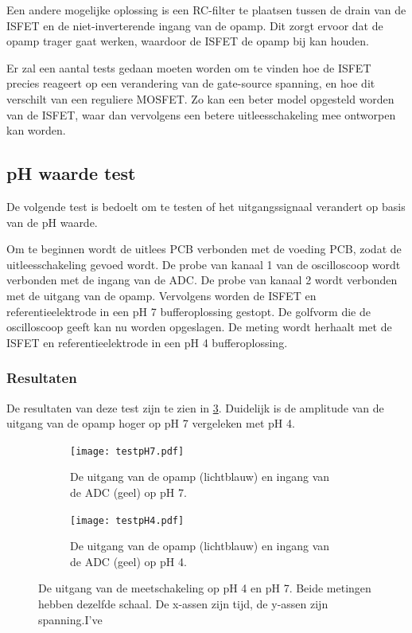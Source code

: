 Een andere mogelijke oplossing is een RC-filter te plaatsen tussen de drain van de ISFET en de niet-inverterende ingang van de opamp. Dit zorgt ervoor dat de opamp trager gaat werken, waardoor de ISFET de opamp bij kan houden.

Er zal een aantal tests gedaan moeten worden om te vinden hoe de ISFET precies reageert op een verandering van de gate-source spanning, en hoe dit verschilt van een reguliere MOSFET. Zo kan een beter model opgesteld worden van de ISFET, waar dan vervolgens een betere uitleesschakeling mee ontworpen kan worden.


\subsection{pH waarde test}
De volgende test is bedoelt om te testen of het uitgangssignaal verandert op basis van de pH waarde.

Om te beginnen wordt de uitlees PCB verbonden met de voeding PCB, zodat de uitleesschakeling gevoed wordt. De probe van kanaal 1 van de oscilloscoop wordt verbonden met de ingang van de ADC. De probe van kanaal 2 wordt verbonden met de uitgang van de opamp. Vervolgens worden de ISFET en referentieelektrode in een pH 7 bufferoplossing gestopt. De golfvorm die de oscilloscoop geeft kan nu worden opgeslagen. De meting wordt herhaalt met de ISFET en referentieelektrode in een pH 4 bufferoplossing.

\subsubsection{Resultaten}
De resultaten van deze test zijn te zien in \cref{fig:resultspHMeasure}. Duidelijk is de amplitude van de uitgang van de opamp hoger op pH 7 vergeleken met pH 4.

\begin{figure}[!htbp]
    \centering
    \begin{subfigure}[b]{0.48\textwidth}
        \centering
        \texttt{[image: testpH7.pdf]}
        \caption{De uitgang van de opamp (lichtblauw) en ingang van de ADC (geel) op pH 7.}
        \label{fig:resultpH7}
    \end{subfigure}
    \hfill
    \begin{subfigure}[b]{0.48\textwidth}
        \centering
        \texttt{[image: testpH4.pdf]}
        \caption{De uitgang van de opamp (lichtblauw) en ingang van de ADC (geel) op pH 4.}
        \label{fig:resultpH4}
    \end{subfigure}
    \caption{De uitgang van de meetschakeling op pH 4 en pH 7. Beide metingen hebben dezelfde schaal. De x-assen zijn tijd, de y-assen zijn spanning.I've }
    \label{fig:resultspHMeasure}
\end{figure}

